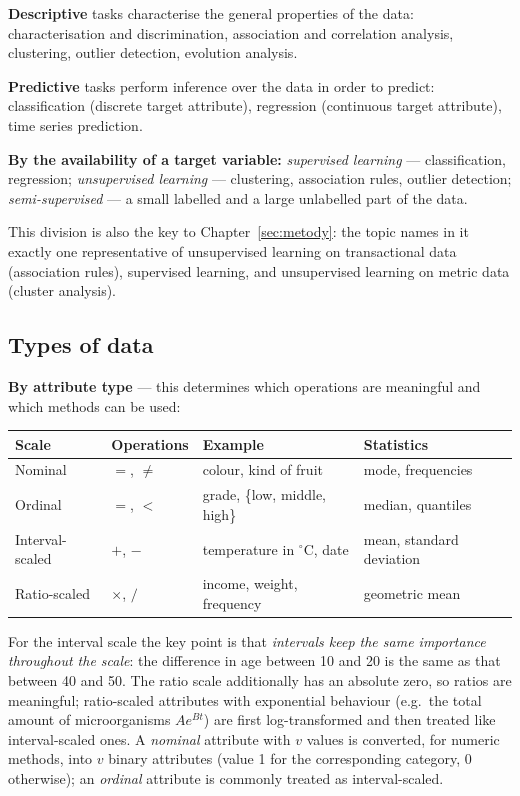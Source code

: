 \documentclass[11pt,a4paper]{article}
\theoremstyle{definition}
\begin{document}
\begin{defbox}
\textbf{Descriptive} tasks characterise the general properties of the data: characterisation
and discrimination, association and correlation analysis, clustering, outlier detection,
evolution analysis.

\textbf{Predictive} tasks perform inference over the data in order to predict: classification
(discrete target attribute), regression (continuous target attribute), time series prediction.
\end{defbox}

\textbf{By the availability of a target variable:} \emph{supervised learning} ---
classification, regression; \emph{unsupervised learning} --- clustering, association rules,
outlier detection; \emph{semi-supervised} --- a small labelled and a large unlabelled part of
the data.

This division is also the key to Chapter~\ref{sec:metody}: the topic names in it exactly one
representative of unsupervised learning on transactional data (association rules), supervised
learning, and unsupervised learning on metric data (cluster analysis).

\subsection{Types of data}

\textbf{By attribute type} --- this determines which operations are meaningful and which methods
can be used:

\begin{center}
\small
\begin{tabular}{@{}p{3.3cm}p{2.2cm}p{5.2cm}p{4.0cm}@{}}
\toprule
\textbf{Scale} & \textbf{Operations} & \textbf{Example} & \textbf{Statistics} \\
\midrule
Nominal & $=$, $\neq$ & colour, kind of fruit & mode, frequencies \\
Ordinal & $=$, $<$ & grade, \{low, middle, high\} & median, quantiles \\
Interval-scaled & $+$, $-$ & temperature in $^{\circ}$C, date & mean, standard deviation \\
Ratio-scaled & $\times$, $/$ & income, weight, frequency & geometric mean \\
\bottomrule
\end{tabular}
\end{center}

For the interval scale the key point is that \emph{intervals keep the same importance
throughout the scale}: the difference in age between 10 and 20 is the same as that between 40
and 50. The ratio scale additionally has an absolute zero, so ratios are meaningful;
ratio-scaled attributes with exponential behaviour (e.g.\ the total amount of microorganisms
$Ae^{Bt}$) are first log-transformed and then treated like interval-scaled ones. A
\emph{nominal} attribute with $v$ values is converted, for numeric methods, into $v$ binary
attributes (value 1 for the corresponding category, 0 otherwise); an \emph{ordinal} attribute is
commonly treated as interval-scaled.
\end{document}
